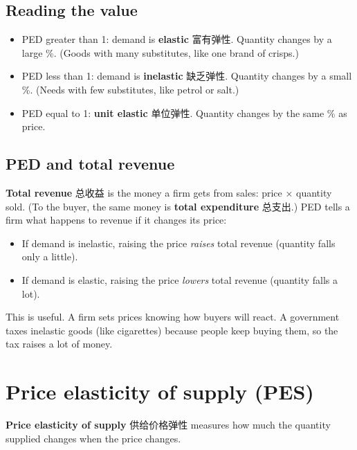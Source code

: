 \documentclass[11pt]{article}
\begin{document}
\subsection*{Reading the value}

\begin{itemize}
\item PED greater than 1: demand is \textbf{elastic} 富有弹性. Quantity changes by a large \%. (Goods with many substitutes, like one brand of crisps.)

\item PED less than 1: demand is \textbf{inelastic} 缺乏弹性. Quantity changes by a small \%. (Needs with few substitutes, like petrol or salt.)

\item PED equal to 1: \textbf{unit elastic} 单位弹性. Quantity changes by the same \% as price.

\end{itemize}

\subsection*{PED and total revenue}

\textbf{Total revenue} 总收益 is the money a firm gets from sales: price × quantity sold. (To the buyer, the same money is \textbf{total expenditure} 总支出.) PED tells a firm what happens to revenue if it changes its price:

\begin{itemize}
\item If demand is inelastic, raising the price \emph{raises} total revenue (quantity falls only a little).

\item If demand is elastic, raising the price \emph{lowers} total revenue (quantity falls a lot).

\end{itemize}

This is useful. A firm sets prices knowing how buyers will react. A government taxes inelastic goods (like cigarettes) because people keep buying them, so the tax raises a lot of money.

\section*{Price elasticity of supply (PES)}

\textbf{Price elasticity of supply} 供给价格弹性 measures how much the quantity supplied changes when the price changes.
\end{document}
